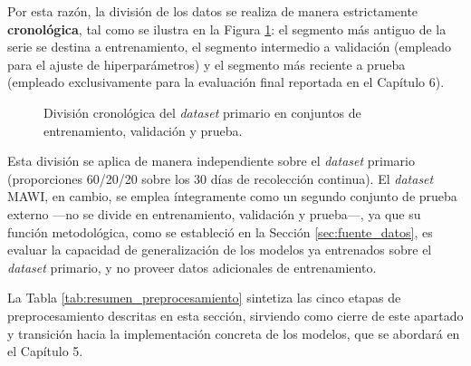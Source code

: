 \documentclass[12pt]{report}
\begin{document}
Por esta razón, la división de los datos se realiza de manera estrictamente \textbf{cronológica}, tal como se ilustra en la Figura \ref{fig:division_temporal}: el segmento más antiguo de la serie se destina a entrenamiento, el segmento intermedio a validación (empleado para el ajuste de hiperparámetros) y el segmento más reciente a prueba (empleado exclusivamente para la evaluación final reportada en el Capítulo 6).

\begin{figure}[H]
    \centering
    \caption{División cronológica del \textit{dataset} primario en conjuntos de entrenamiento, validación y prueba.}
    \label{fig:division_temporal}
\end{figure}

Esta división se aplica de manera independiente sobre el \textit{dataset} primario (proporciones 60/20/20 sobre los 30 días de recolección continua). El \textit{dataset} MAWI, en cambio, se emplea íntegramente como un segundo conjunto de prueba externo ---no se divide en entrenamiento, validación y prueba---, ya que su función metodológica, como se estableció en la Sección \ref{sec:fuente_datos}, es evaluar la capacidad de generalización de los modelos ya entrenados sobre el \textit{dataset} primario, y no proveer datos adicionales de entrenamiento.

La Tabla \ref{tab:resumen_preprocesamiento} sintetiza las cinco etapas de preprocesamiento descritas en esta sección, sirviendo como cierre de este apartado y transición hacia la implementación concreta de los modelos, que se abordará en el Capítulo 5.
\end{document}
